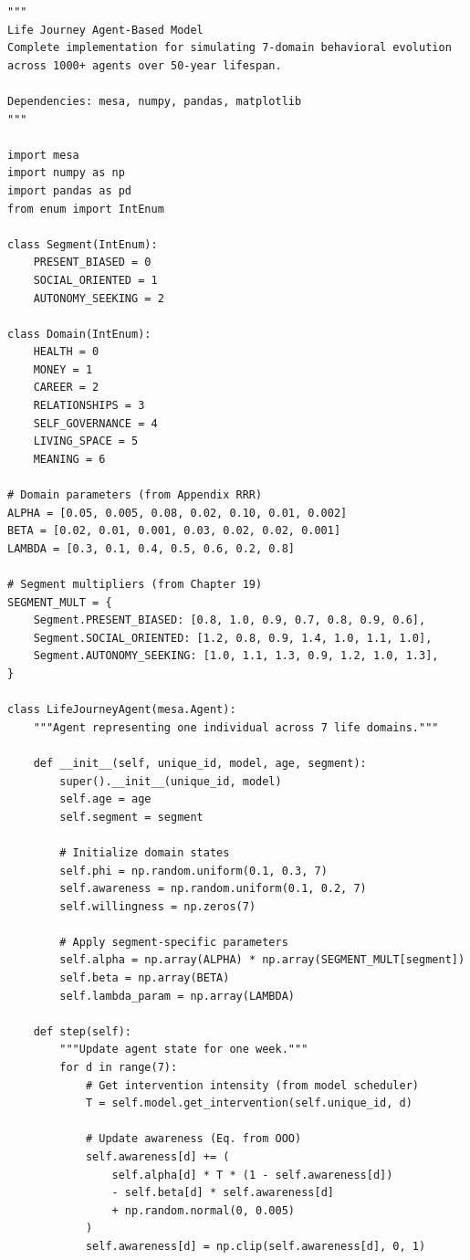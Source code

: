 \begin{verbatim}
"""
Life Journey Agent-Based Model
Complete implementation for simulating 7-domain behavioral evolution
across 1000+ agents over 50-year lifespan.

Dependencies: mesa, numpy, pandas, matplotlib
"""

import mesa
import numpy as np
import pandas as pd
from enum import IntEnum

class Segment(IntEnum):
    PRESENT_BIASED = 0
    SOCIAL_ORIENTED = 1
    AUTONOMY_SEEKING = 2

class Domain(IntEnum):
    HEALTH = 0
    MONEY = 1
    CAREER = 2
    RELATIONSHIPS = 3
    SELF_GOVERNANCE = 4
    LIVING_SPACE = 5
    MEANING = 6

# Domain parameters (from Appendix RRR)
ALPHA = [0.05, 0.005, 0.08, 0.02, 0.10, 0.01, 0.002]
BETA = [0.02, 0.01, 0.001, 0.03, 0.02, 0.02, 0.001]
LAMBDA = [0.3, 0.1, 0.4, 0.5, 0.6, 0.2, 0.8]

# Segment multipliers (from Chapter 19)
SEGMENT_MULT = {
    Segment.PRESENT_BIASED: [0.8, 1.0, 0.9, 0.7, 0.8, 0.9, 0.6],
    Segment.SOCIAL_ORIENTED: [1.2, 0.8, 0.9, 1.4, 1.0, 1.1, 1.0],
    Segment.AUTONOMY_SEEKING: [1.0, 1.1, 1.3, 0.9, 1.2, 1.0, 1.3],
}

class LifeJourneyAgent(mesa.Agent):
    """Agent representing one individual across 7 life domains."""

    def __init__(self, unique_id, model, age, segment):
        super().__init__(unique_id, model)
        self.age = age
        self.segment = segment

        # Initialize domain states
        self.phi = np.random.uniform(0.1, 0.3, 7)
        self.awareness = np.random.uniform(0.1, 0.2, 7)
        self.willingness = np.zeros(7)

        # Apply segment-specific parameters
        self.alpha = np.array(ALPHA) * np.array(SEGMENT_MULT[segment])
        self.beta = np.array(BETA)
        self.lambda_param = np.array(LAMBDA)

    def step(self):
        """Update agent state for one week."""
        for d in range(7):
            # Get intervention intensity (from model scheduler)
            T = self.model.get_intervention(self.unique_id, d)

            # Update awareness (Eq. from OOO)
            self.awareness[d] += (
                self.alpha[d] * T * (1 - self.awareness[d])
                - self.beta[d] * self.awareness[d]
                + np.random.normal(0, 0.005)
            )
            self.awareness[d] = np.clip(self.awareness[d], 0, 1)


\end{verbatim}
